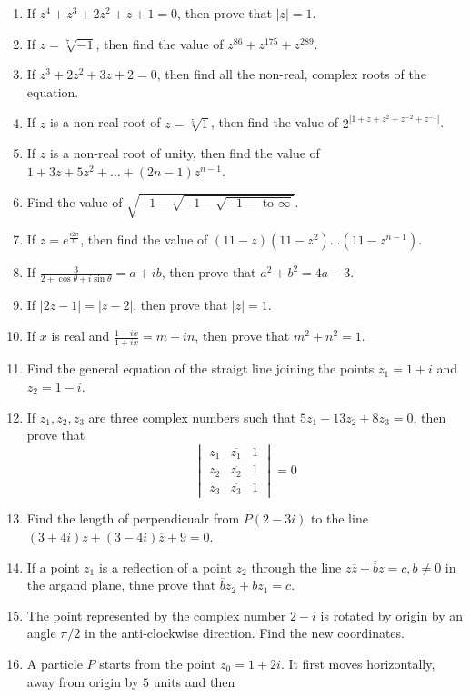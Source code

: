 \begin{enumerate}[resume]
\item If $z^4 + z^3 + 2z^2 + z + 1 = 0$, then prove that $|z| = 1$.
\item If $z = \sqrt[7]{-1}$, then find the value of $z^{86} + z^{175} + z^{289}$.
\item If $z^3 + 2z^2 + 3z + 2 = 0$, then find all the non-real, complex roots of the equation.
\item If $z$ is a non-real root of $z = \sqrt[5]{1}$, then find the value of $2^{|1 + z + z^2 + z^{-2} + z^{-1}|}$.
\item If $z$ is a non-real root of unity, then find the value of $1 + 3z + 5z^2 + \ldots + (2n - 1)z^{n - 1}$.
\item Find the value of $\sqrt{-1 - \sqrt{-1 - \sqrt{-1 - \text{~to~} \infty}}}$.
\item If $z = e^{\frac{i2\pi}{n}}$, then find the value of $(11 - z)(11 - z^2)\ldots(11 - z^{n - 1})$.
\item If $\frac{3}{2 + \cos\theta + i\sin\theta} = a + ib$, then prove that $a^2 + b^2 = 4a - 3$.
\item If $|2z - 1| = |z - 2|$, then prove that $|z| = 1$.
\item If $x$ is real and $\frac{1 - ix}{1 + ix} = m + in$, then prove that $m^2 + n^2 = 1$.
\item Find the general equation of the straigt line joining the points $z_1 = 1 + i$ and $z_2 = 1 - i$.
\item If $z_1, z_2, z_3$ are three complex numbers such that $5z_1 - 13z_2 + 8z_3 = 0$, then prove that $$\begin{vmatrix}z_1 &
  \overline{z_1} & 1\\ z_2 & \overline{z_2} & 1\\ z_3 & \overline{z_3} & 1\end{vmatrix} = 0$$
\item Find the length of perpendicualr from $P(2 - 3i)$ to the line $(3 + 4i)z + (3 - 4i)\overline{z} + 9 = 0$.
\item If a point $z_1$ is a reflection of a point $z_2$ through the line $z\overline{z} + \overline{b}z = c, b\neq 0$ in the argand
  plane, thne prove that $\overline{b}z_2 + b\overline{z_1} = c$.
\item The point represented by the complex number $2 - i$ is rotated by origin by an angle $\pi/2$ in the anti-clockwise
  direction. Find the new coordinates.
\item A particle $P$ starts from the point $z_0 = 1 + 2i$. It first moves horizontally, away from origin by $5$ units and then

\end{enumerate}
